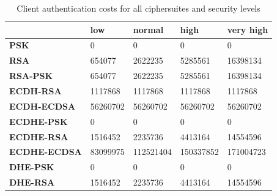 \documentclass{llncs}
\begin{document}
\begin{table}[]
  \begin{tabular}{|l|l|l|l|l|}
  \hline
                       & \textbf{low} & \textbf{normal} & \textbf{high} & \textbf{very high} \\ \hline
  \textbf{PSK}         & 0            & 0               & 0             & 0                  \\ \hline
  \textbf{RSA}         & 654077       & 2622235         & 5285561       & 16398134           \\ \hline
  \textbf{RSA-PSK}     & 654077       & 2622235         & 5285561       & 16398134           \\ \hline
  \textbf{ECDH-RSA}    & 1117868      & 1117868         & 1117868       & 1117868           \\ \hline
  \textbf{ECDH-ECDSA}  & 56260702     & 56260702        & 56260702      & 56260702          \\ \hline
  \textbf{ECDHE-PSK}   & 0            & 0               & 0             & 0                  \\ \hline
  \textbf{ECDHE-RSA}   & 1516452       & 2235736         & 4413164       & 14554596           \\ \hline
  \textbf{ECDHE-ECDSA} & 83099975     & 112521404       & 150337852     & 171004723          \\ \hline
  \textbf{DHE-PSK}     & 0            & 0               & 0             & 0                  \\ \hline
  \textbf{DHE-RSA}     & 1516452       & 2235736         & 4413164       & 14554596           \\ \hline
  \end{tabular}
  \centering \caption{\label{table:tls-auth-cost-client} Client authentication costs for all ciphersuites and security levels}
  \end{table}
\end{document}
